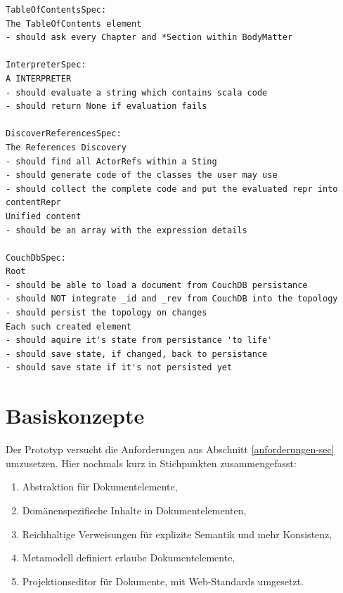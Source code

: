 \begin{verbatim}
TableOfContentsSpec:
The TableOfContents element
- should ask every Chapter and *Section within BodyMatter

InterpreterSpec:
A INTERPRETER
- should evaluate a string which contains scala code
- should return None if evaluation fails

DiscoverReferencesSpec:
The References Discovery
- should find all ActorRefs within a Sting
- should generate code of the classes the user may use
- should collect the complete code and put the evaluated repr into contentRepr
Unified content
- should be an array with the expression details

CouchDbSpec:
Root
- should be able to load a document from CouchDB persistance
- should NOT integrate _id and _rev from CouchDB into the topology
- should persist the topology on changes
Each such created element
- should aquire it's state from persistance 'to life'
- should save state, if changed, back to persistance
- should save state if it's not persisted yet
\end{verbatim}
 
\section{Basiskonzepte}\label{basiskonzepte}
 
Der Prototyp versucht die Anforderungen aus Abschnitt \ref{anforderungen-sec} umzusetzen. Hier nochmals kurz in Stichpunkten zusammengefasst:

 
\begin{enumerate}

\item Abstraktion für Dokumentelemente,
\item Domänenspezifische Inhalte in Dokumentelementen,
\item Reichhaltige Verweisungen für explizite Semantik und mehr Konsistenz,
\item Metamodell definiert erlaube Dokumentelemente,
\item Projektionseditor für Dokumente, mit Web-Standards umgesetzt.
\end{enumerate}
 
